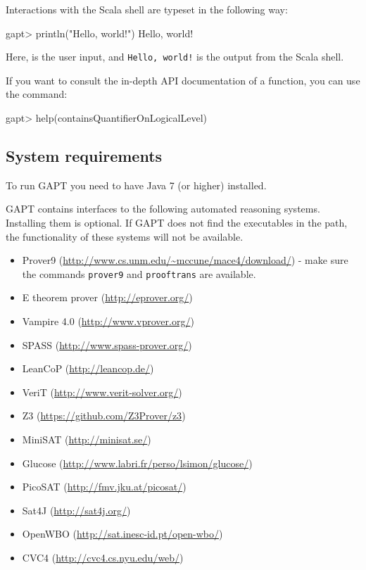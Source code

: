 \documentclass[a4paper,11pt]{article}
\newcommand{\cli}[1]{{\ttfamily {#1}}}
\begin{document}
Interactions with the Scala shell are typeset in the following way:
\begin{clilisting}
gapt> println("Hello, world!")
Hello, world!

\end{clilisting}
Here, {\bfseries \cli{println("Hello, world!")}} is the user input, and \texttt{Hello,
world!} is the output from the Scala shell.

If you want to consult the in-depth API documentation of a function, you can
use the \cli{help} command:
\begin{clilisting}
gapt> help(containsQuantifierOnLogicalLevel)

\end{clilisting}

\subsection{System requirements}
\label{sec:sysreq}

To run GAPT you need to have Java 7 (or higher) installed.

GAPT contains interfaces to the following automated reasoning systems. Installing
them is optional. If GAPT does not find the executables in the path, the
functionality of these systems will not be available.

\begin{itemize}
\item Prover9 (\url{http://www.cs.unm.edu/~mccune/mace4/download/}) - make sure
  the commands \texttt{prover9} and \texttt{prooftrans} are available.
\item E theorem prover (\url{http://eprover.org/})
\item Vampire 4.0 (\url{http://www.vprover.org/})
\item SPASS (\url{http://www.spass-prover.org/})
\item LeanCoP (\url{http://leancop.de/})
\item VeriT (\url{http://www.verit-solver.org/})
\item Z3 (\url{https://github.com/Z3Prover/z3})
\item MiniSAT (\url{http://minisat.se/})
\item Glucose (\url{http://www.labri.fr/perso/lsimon/glucose/})
\item PicoSAT (\url{http://fmv.jku.at/picosat/})
\item Sat4J (\url{http://sat4j.org/})
\item OpenWBO (\url{http://sat.inesc-id.pt/open-wbo/})
\item CVC4 (\url{http://cvc4.cs.nyu.edu/web/})
\end{itemize}
\end{document}
